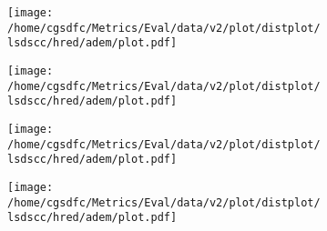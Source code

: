 \documentclass{article}%
\begin{document}
%


\begin{figure}%
\begin{subfigure}{0.33\\linewidth}%
\texttt{[image: /home/cgsdfc/Metrics/Eval/data/v2/plot/distplot/lsdscc/hred/adem/plot.pdf]}%
\end{subfigure}%
\begin{subfigure}{0.33\\linewidth}%
\texttt{[image: /home/cgsdfc/Metrics/Eval/data/v2/plot/distplot/lsdscc/hred/adem/plot.pdf]}%
\end{subfigure}%
\begin{subfigure}{0.33\\linewidth}%
\texttt{[image: /home/cgsdfc/Metrics/Eval/data/v2/plot/distplot/lsdscc/hred/adem/plot.pdf]}%
\end{subfigure}%


\begin{subfigure}{0.33\linewidth}%
\texttt{[image: /home/cgsdfc/Metrics/Eval/data/v2/plot/distplot/lsdscc/hred/adem/plot.pdf]}%
\end{subfigure}

%
\end{figure}

%
\end{document}
